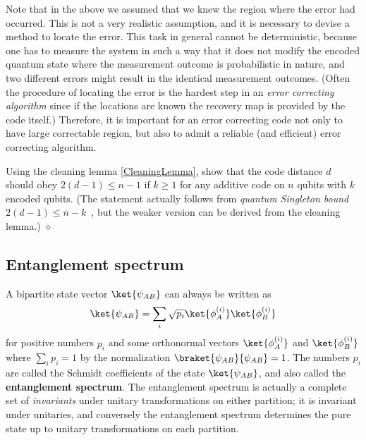 Note that in the above we assumed that we knew the region where the error had occurred.
This is not a very realistic assumption,
and it is necessary to devise a method to locate the error.
This task in general cannot be deterministic,
because 
one has to measure the system in such a way that it does not modify the encoded
quantum state where the measurement outcome is probabilistic in nature,
and two different errors might result in the identical measurement outcomes.
(Often the procedure of locating the error is the hardest step in an 
{\em error correcting algorithm}
since if the locations are known the recovery map is provided by the code itself.)
Therefore, it is important for an error correcting code not only to have large correctable region,
but also to admit a reliable (and efficient) error correcting algorithm.

\begin{exc}
Using the cleaning lemma \ref{CleaningLemma},
show that the code distance $d$ should obey 
$2(d-1) \le n-1$ if $k \ge 1$ for any additive code on $n$ qubits
with $k$ encoded qubits.
(The statement actually follows from {\em quantum Singleton bound}
$2(d-1) \le n-k$~\cite{KnillLaflamme1997Theory},
but the weaker version can be derived from the cleaning lemma.)
\hfill $\diamond$ \end{exc}


\subsection{Entanglement spectrum}

A bipartite state  vector $\ket{\psi_{AB}}$ can always be written as
\begin{align}
\ket{\psi_{AB}} = \sum_i \sqrt{p_i} \ket{\phi_A^{(i)}} \ket{\phi_B^{(i)}}
\end{align}
for positive numbers $p_i$ and some 
orthonormal vectors $\ket{\phi_A^{(i)}}$ and $\ket{\phi_B^{(i)}}$
where $\sum_i p_i = 1$ by the normalization $\braket{\psi_{AB}}{\psi_{AB}} = 1$.
The numbers $p_i$ are called the Schmidt coefficients of the state $\ket{\psi_{AB}}$,
and also called the {\bf entanglement spectrum}.
The entanglement spectrum is actually a complete set of {\em invariants}
under unitary transformations on either partition;
it is invariant under unitaries, and conversely 
the entanglement spectrum determines the pure state
up to unitary transformations on each partition.

